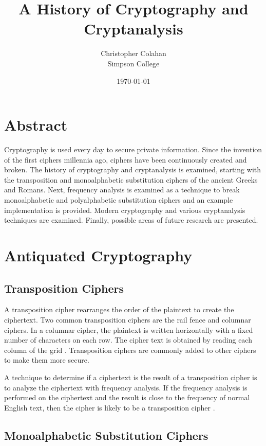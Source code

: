 \documentclass[12pt]{article}
\title{A History of Cryptography and Cryptanalysis}
\date{\today}
\author{Christopher Colahan\\ Simpson College}
\begin{document}
\maketitle
\newpage

\tableofcontents
\listoffigures
\newpage



\section{Abstract}
Cryptography is used every day to secure private information. Since the invention of the first ciphers
millennia ago, ciphers have been continuously created and broken. The history of cryptography and
cryptanalysis is examined, starting with the transposition and monoalphabetic substitution ciphers of the
ancient Greeks and Romans. Next, frequency analysis is examined as a technique to break monoalphabetic
and polyalphabetic substitution ciphers and an example implementation is provided. Modern cryptography and various cryptanalysis techniques are examined. Finally, possible areas of future research are presented.

\section{Antiquated Cryptography}
\subsection{Transposition Ciphers}
A transposition cipher rearranges the order of the plaintext to create the ciphertext. Two common transposition ciphers are the rail fence and columnar ciphers. In a columnar cipher, the plaintext is written horizontally with a fixed number of characters on each row. The cipher text is obtained by reading each column of the grid \cite{appcrypt}. Transposition ciphers are commonly added to other ciphers to make them more secure.

A technique to determine if a ciphertext is the result of a transposition cipher is to analyze the ciphertext with frequency analysis. If the frequency analysis is performed on the ciphertext and the result is close to the frequency of normal English text, then the cipher is likely to be a transposition cipher \cite{appcrypt}.

\subsection{Monoalphabetic Substitution Ciphers}
\end{document}
